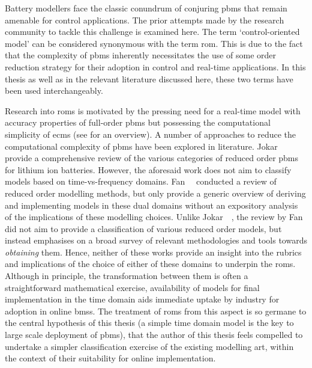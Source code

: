 

Battery  modellers face  the  classic conundrum  of  conjuring \glspl{pbm}  that
remain  amenable  for control  applications.  The  prior  attempts made  by  the
research  community  to  tackle  this  challenge  is  examined  here.  The  term
`control-oriented model' can  be considered synonymous with  the term \gls{rom}.
This  is  due  to  the  fact  that  the  complexity  of  \glspl{pbm}  inherently
necessitates the  use of  some order  reduction strategy  for their  adoption in
control and  real-time applications. In this  thesis as well as  in the relevant
literature discussed here, these two terms have been used interchangeably.

Research   into  \glspl{rom}   is  motivated   by  the   pressing  need   for  a
real-time   model   with   accuracy   properties   of   full-order   \glspl{pbm}
but   possessing    the   computational    simplicity   of    \glspl{ecm}   (see
 for  an overview).  A number  of approaches
to  reduce  the  computational  complexity of  \glspl{pbm}  have  been  explored
in  literature.  Jokar~\etal~\cite{Jokar2016}  provide  a  comprehensive  review
of  the  various  categories  of  reduced  order  \glspl{pbm}  for  lithium  ion
batteries.  However,  the  aforesaid  work  does  not  aim  to  classify  models
based  on  time-vs-frequency  domains.  Fan~\etal{}~\cite{Fan2015}  conducted  a
review  of  reduced  order  modelling   methods,  but  only  provide  a  generic
overview of  deriving and implementing models  in these dual domains  without an
expository  analysis of  the  implications of  these  modelling choices.  Unlike
Jokar~\etal~\cite{Jokar2016}, the review by Fan~\etal{} did not aim to provide a
classification  of various  reduced order  models, but  instead emphasises  on a
broad survey of relevant methodologies  and tools towards \emph{obtaining} them.
Hence,  neither  of  these  works  provide  an  insight  into  the  rubrics  and
implications  of  the  choice  of  either  of  these  domains  to  underpin  the
\glspl{rom}. Although  in principle,  the transformation  between them  is often
a  straightforward  mathematical  exercise,  availability of  models  for  final
implementation in the time domain aids immediate uptake by industry for adoption
in  online \glspl{bms}.  The treatment  of \glspl{rom}  from this  aspect is  so
germane to the central hypothesis of this  thesis (a simple time domain model is
the  key to  large scale  deployment of  \glspl{pbm}), that  the author  of this
thesis feels  compelled to  undertake a simpler  classification exercise  of the
existing  modelling art,  within the  context  of their  suitability for  online
implementation.


